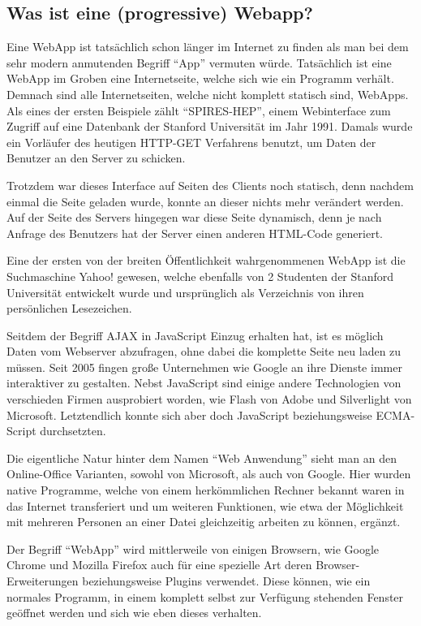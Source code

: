 \documentclass[a4paper,12pt,ngerman,listof=numbered]{scrartcl}      %
\let\oldcite\cite
\renewcommand{\cite}[1]{\textsuperscript{\oldcite{#1}}}
\begin{document}
	\subsection{Was ist eine (progressive) Webapp?}
	Eine WebApp ist tatsächlich schon länger im Internet zu finden als man bei dem sehr modern anmutenden Begriff ``App'' vermuten würde. Tatsächlich ist eine WebApp im Groben eine Internetseite, welche sich wie ein Programm verhält. Demnach sind alle Internetseiten, welche nicht komplett statisch sind, WebApps. Als eines der ersten Beispiele zählt ``SPIRES-HEP'', einem Webinterface zum Zugriff auf eine Datenbank der Stanford Universität im Jahr 1991. Damals wurde ein Vor\-läu\-fer des heutigen HTTP-GET Verfahrens benutzt, um Daten der Benutzer an den Server zu schicken.\par
	Trotzdem war dieses Interface auf Seiten des Clients noch statisch, denn nachdem einmal die Seite geladen wurde, konnte an dieser nichts mehr verändert werden. Auf der Seite des Servers hingegen war diese Seite dynamisch, denn je nach Anfrage des Benutzers hat der Server einen anderen HTML-Code generiert.\par
	Eine der ersten von der breiten Öffentlichkeit wahrgenommenen WebApp ist die Suchmaschine Yahoo! gewesen, welche ebenfalls von 2 Studenten der Stanford Universität entwickelt wurde und ursprünglich als Verzeichnis von ihren persönlichen Lesezeichen.\cite{webappWiki}\par
	Seitdem der Begriff AJAX in JavaScript Einzug erhalten hat, ist es möglich Daten vom Webserver abzufragen, ohne dabei die komplette Seite neu laden zu müssen. Seit 2005 fingen große Unternehmen wie Google an ihre Dienste immer interaktiver zu gestalten. Nebst JavaScript sind einige andere Technologien von verschieden Firmen ausprobiert worden, wie Flash von Adobe und Silverlight von Microsoft. Letztendlich konnte sich aber doch JavaScript beziehungsweise ECMA-Script durchsetzten.\cite{webappWikiEN}\par
	Die eigentliche Natur hinter dem Namen ``Web Anwendung'' sieht man an den Online-Office Varianten, sowohl von Microsoft, als auch von Google. Hier wurden native Programme, welche von einem herkömmlichen Rechner bekannt waren in das Internet transferiert und um weiteren Funktionen, wie etwa der Möglichkeit mit mehreren Personen an einer Datei gleichzeitig arbeiten zu können, ergänzt.\par
	Der Begriff ``WebApp'' wird mittlerweile von einigen Browsern, wie Google Chrome und Mozilla Firefox auch für eine spezielle Art deren Browser-Erweiterungen beziehungsweise Plugins verwendet. Diese können, wie ein normales Programm, in einem komplett selbst zur Verfügung stehenden Fenster geöffnet werden und sich wie eben dieses verhalten.\cite{chromeWebStore}\par
\end{document}
